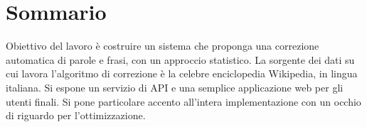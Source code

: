 

\begingroup
\let\clearpage\relax
\let\cleardoublepage\relax
\let\cleardoublepage\relax

\chapter*{Sommario} %

Obiettivo del lavoro è costruire un sistema che proponga una correzione automatica di parole e frasi, con un approccio statistico. La sorgente dei dati su cui lavora l'algoritmo di correzione è la celebre enciclopedia Wikipedia, in lingua italiana. Si espone un servizio di API e una semplice applicazione web per gli utenti finali. Si pone particolare accento all'intera implementazione con un occhio di riguardo per l’ottimizzazione. 

\endgroup			

\vfill
